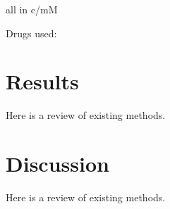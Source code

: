 \documentclass[
  12pt,
]{book}
\begin{document}
all in c/mM

Drugs used:

\hypertarget{results}{%
\chapter{Results}\label{results}}

Here is a review of existing methods.

\hypertarget{discussion}{%
\chapter{Discussion}\label{discussion}}

Here is a review of existing methods.

  
\end{document}
